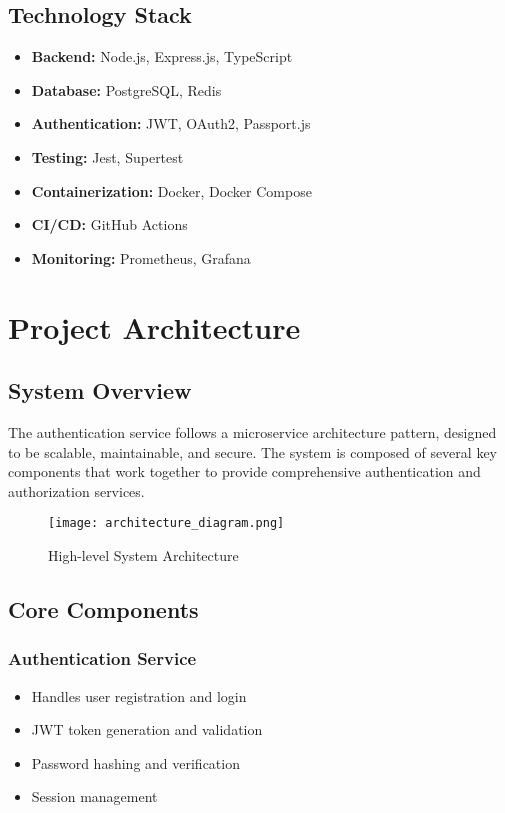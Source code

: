 \documentclass[12pt,a4paper]{article}
\begin{document}
\subsection{Technology Stack}
\begin{itemize}
    \item \textbf{Backend:} Node.js, Express.js, TypeScript
    \item \textbf{Database:} PostgreSQL, Redis
    \item \textbf{Authentication:} JWT, OAuth2, Passport.js
    \item \textbf{Testing:} Jest, Supertest
    \item \textbf{Containerization:} Docker, Docker Compose
    \item \textbf{CI/CD:} GitHub Actions
    \item \textbf{Monitoring:} Prometheus, Grafana
\end{itemize}

\section{Project Architecture}

\subsection{System Overview}

The authentication service follows a microservice architecture pattern, designed to be scalable, maintainable, and secure. The system is composed of several key components that work together to provide comprehensive authentication and authorization services.

\begin{figure}[H]
    \centering
    \texttt{[image: architecture\_diagram.png]}
    \caption{High-level System Architecture}
    \label{fig:architecture}
\end{figure}

\subsection{Core Components}

\subsubsection{Authentication Service}
\begin{itemize}
    \item Handles user registration and login
    \item JWT token generation and validation
    \item Password hashing and verification
    \item Session management
\end{itemize}
\end{document}
